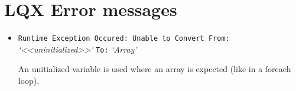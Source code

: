 \section{LQX Error messages}

\begin{itemize}
\item \texttt{Runtime Exception Occured: Unable to Convert From:} \emph{`<<uninitialized>>'} \texttt{To:} \emph{`Array'}

  An unitialized variable is used where an array is expected (like in
  a foreach loop).
\end{itemize}


